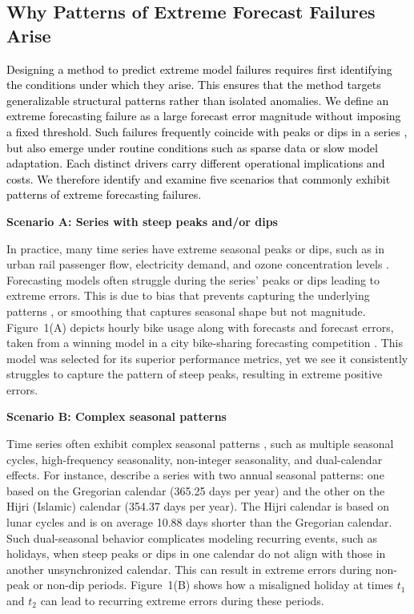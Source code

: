 \documentclass[]{interact}
\newcommand{\matt}[1]{\textcolor{black}{#1}}
\theoremstyle{plain}
\theoremstyle{definition}
\theoremstyle{remark}
\newenvironment{scenario}[1]{%
  \par\vspace{1ex}\noindent\textbf{#1}\par\vspace{0.5ex}}{\par}
\begin{document}
\subsection{Why Patterns of Extreme Forecast Failures Arise}

\matt{Designing a method to predict extreme model failures requires first identifying the conditions under which they arise. This ensures that the method targets generalizable structural patterns rather than isolated anomalies. We define an extreme forecasting failure as a large forecast error magnitude without imposing a fixed threshold.  Such failures frequently coincide with peaks or dips in a series \citep{marvin2022}, but also emerge under routine conditions such as sparse data or slow model adaptation. Each distinct drivers carry different operational implications and costs. We therefore identify and examine five scenarios that commonly exhibit patterns of extreme forecasting failures.}

\begin{scenario}{Scenario A: Series with steep peaks and/or dips}
In practice, many time series have extreme seasonal peaks or dips, such as in urban rail passenger flow, electricity demand, and ozone concentration levels  \citep{li2024, amaraouali2023, marvin2022}. Forecasting models often struggle during the series' peaks or dips leading to extreme errors. This is due to bias that prevents capturing the underlying patterns \citep{lin2023}, or smoothing that captures seasonal shape but not magnitude. Figure~1(A) depicts hourly bike usage along with forecasts and forecast errors, taken from a winning model in a city bike-sharing forecasting competition \citep{mohit2020}. This model was selected for its superior performance metrics, yet we see it consistently struggles to capture the pattern of steep peaks, resulting in extreme positive errors.
\end{scenario}

\begin{scenario}{Scenario B: Complex seasonal patterns}
Time series often exhibit complex seasonal patterns \citep{zhao2024}, such as multiple seasonal cycles, high-frequency seasonality, non-integer seasonality, and dual-calendar effects. For instance, \cite{delivera2011} describe a series with two annual seasonal patterns: one based on the Gregorian calendar (365.25 days per year) and the other on the Hijri (Islamic) calendar (354.37 days per year). The Hijri calendar is based on lunar cycles and is on average 10.88 days shorter than the Gregorian calendar. Such dual-seasonal behavior complicates modeling recurring events, such as holidays, when steep peaks or dips in one calendar do not align with those in another unsynchronized calendar. This can result in extreme errors during non-peak or non-dip periods. Figure~1(B) shows how a misaligned holiday at times $t_1$ and $t_2$ can lead to recurring extreme errors during these periods.
\end{scenario}
\end{document}
